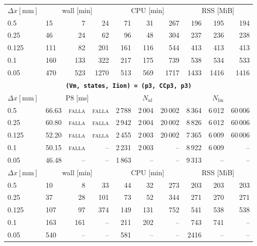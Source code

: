 \documentclass[11pt,a4paper]{article}
\newcommand{\code}[1]{\texttt{\small #1}}
\begin{document}
\begin{center}
\begin{longtable}{l|lrr|rrr|rrr}
\hline
$ \Delta x [\text{mm}] $ & \multicolumn{3}{c|}{wall [min]} & \multicolumn{3}{c|}{CPU [min]} & \multicolumn{3}{c|}{RSS [MiB]}\\
0.5 & 15 & 7 & 24 & 71 & 31 & 267 & 196 & 195 & 194\\
0.25 & 46 & 24 & 62 & 96 & 48 & 304 & 237 & 236 & 238\\
0.125 & 111 & 82 & 201 & 161 & 116 & 544 & 413 & 413 & 413\\
0.1 & 160 & 133 & 322 & 217 & 175 & 739 & 538 & 534 & 533\\
0.05 & 470 & 523 & 1270 & 513 & 569 & 1717 & 1433 & 1416 & 1416\\
\hline
\hline
\multicolumn{10}{c}{\textbf{\code{(Vm, states, Iion) = (p3, CCp3, p3)}}}\\\hline
$ \Delta x [\text{mm}] $ & \multicolumn{3}{c|}{P8 [ms]} & \multicolumn{3}{c|}{$N_{\mathrm{nl}}$} & \multicolumn{3}{c|}{$N_{\mathrm{lin}}$}\\
0.5 & 66.63 & \textsc{falla} & \textsc{falla} & 2\,788 & 2\,004 & 20\,002 & 8\,364 & 6\,012 & 60\,006\\
0.25 & 60.80 & \textsc{falla} & \textsc{falla} & 2\,942 & 2\,004 & 20\,002 & 8\,826 & 6\,012 & 60\,006\\
0.125 & 52.20 & \textsc{falla} & \textsc{falla} & 2\,455 & 2\,003 & 20\,002 & 7\,365 & 6\,009 & 60\,006\\
0.1 & 50.15 & \textsc{falla} & -- & 2\,231 & 2\,003 & -- & 8\,922 & 6\,009 & --\\
0.05 & 46.48 & -- & -- & 1\,863 & -- & -- & 9\,313 & -- & --\\
\hline
$ \Delta x [\text{mm}] $ & \multicolumn{3}{c|}{wall [min]} & \multicolumn{3}{c|}{CPU [min]} & \multicolumn{3}{c|}{RSS [MiB]}\\
0.5 & 10 & 8 & 33 & 44 & 32 & 273 & 203 & 203 & 203\\
0.25 & 37 & 28 & 101 & 73 & 52 & 344 & 271 & 270 & 271\\
0.125 & 107 & 97 & 374 & 149 & 131 & 752 & 541 & 538 & 538\\
0.1 & 163 & 161 & -- & 211 & 202 & -- & 743 & 741 & --\\
0.05 & 540 & -- & -- & 581 & -- & -- & 2416 & -- & --\\
\hline
\bottomrule\end{longtable}\end{center}
\end{document}
